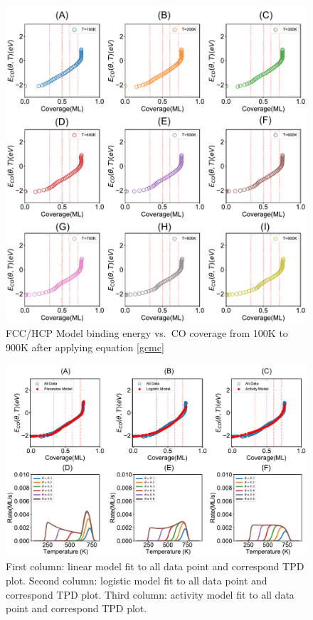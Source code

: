 \documentclass[11pt]{article}
\begin{document}
\begin{figure} [ht]
\centering
\includegraphics[width=15cm]{Figure/2E-T.pdf}
\caption{FCC/HCP Model binding energy vs.\ CO coverage from 100K to 900K after applying equation \ref{gcmc}}
\label{2E}
\end{figure}

\begin{figure} [h]
\centering
\includegraphics[width=15cm]{Figure/2function.pdf}
\caption{First column: linear model fit to all data point and correspond TPD plot. Second column: logistic model fit to all data point and correspond TPD plot. Third column: activity model fit to all data point and correspond TPD plot.}
\label{2func}
\end{figure}
\end{document}
